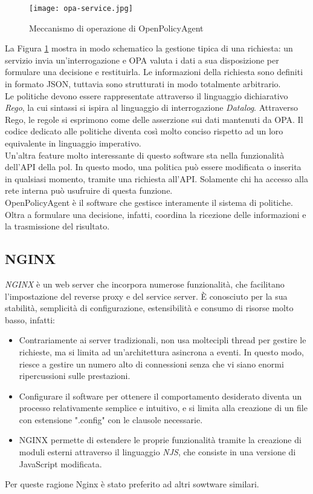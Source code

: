\begin{figure}[h]
    \texttt{[image: opa-service.jpg]}
    \centering
    \caption{Meccanismo di operazione di OpenPolicyAgent}
    \label{OPAWork}
\end{figure} 
La Figura \ref*{OPAWork} mostra in modo schematico la gestione tipica di una richiesta: un servizio invia un'interrogazione e OPA valuta i dati a sua disposizione per formulare una decisione e restituirla. 
Le informazioni della richiesta sono definiti in formato JSON, tuttavia sono strutturati in modo totalmente arbitrario. 
\\ Le politiche devono essere rappresentate attraverso il linguaggio dichiarativo 
\textit{Rego}, la cui sintassi si ispira al linguaggio 
di interrogazione \textit{Datalog}. 
Attraverso Rego, le regole si esprimono come delle asserzione sui dati mantenuti da OPA.
Il codice dedicato alle politiche diventa così molto conciso rispetto ad un loro equivalente in 
linguaggio imperativo. 
\\ Un'altra feature molto interessante di questo software sta nella funzionalità dell'API della pol. In questo modo, una politica può essere modificata o inserita 
in qualsiasi momento, tramite una richiesta all'API. Solamente chi ha accesso alla rete interna può usufruire di questa funzione. 
\\ OpenPolicyAgent è il software che gestisce interamente il sistema di politiche. Oltra a formulare una decisione,
 infatti, coordina la ricezione delle informazioni e la trasmissione del risultato.  


\subsection{NGINX}
\textit{NGINX} è un web server che incorpora numerose funzionalità, che facilitano l'impostazione del reverse proxy e del 
service server. 
È conosciuto per la sua stabilità, semplicità di configurazione, estensibilità e consumo di risorse molto basso, infatti:
\begin{itemize}
    \item 
    Contrariamente ai server tradizionali,  
    non usa moltecipli thread per gestire le richieste, ma si limita ad un'architettura asincrona a eventi. 
    In questo modo, riesce a gestire un numero alto di connessioni senza che vi siano enormi ripercussioni sulle prestazioni. 
    
    \item Configurare il software per ottenere il comportamento desiderato diventa un processo relativamente semplice e intuitivo, e si
    limita alla creazione di un file con estensione ".config" con le clausole necessarie. 
    \item NGINX permette di estendere le proprie funzionalità tramite la creazione di moduli esterni attraverso il linguaggio \textit{NJS}, 
    che consiste in una versione di JavaScript modificata. 
\end{itemize}
Per queste ragione Nginx è stato preferito ad altri sowtware similari.

